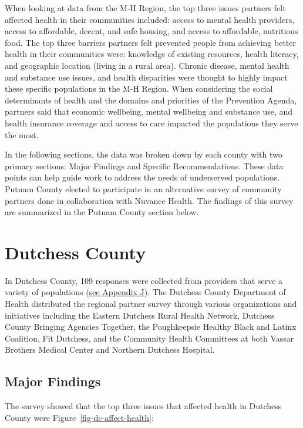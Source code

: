 \documentclass[
  english,
  letterpaper,
]{report}
\begin{document}
When looking at data from the M-H Region, the top three issues partners
felt affected health in their communities included: access to mental
health providers, access to affordable, decent, and safe housing, and
access to affordable, nutritious food. The top three barriers partners
felt prevented people from achieving better health in their communities
were: knowledge of existing resources, health literacy, and geographic
location (living in a rural area). Chronic disease, mental health and
substance use issues, and health disparities were thought to highly
impact these specific populations in the M-H Region. When considering
the social determinants of health and the domains and priorities of the
Prevention Agenda, partners said that economic wellbeing, mental
wellbeing and substance use, and health insurance coverage and access to
care impacted the populations they serve the most.

In the following sections, the data was broken down by each county with
two primary sections: Major Findings and Specific Recommendations. These
data points can help guide work to address the needs of underserved
populations. Putnam County elected to participate in an alternative
survey of community partners done in collaboration with Nuvance Health.
The findings of this survey are summarized in the Putnam County section
below.

\section{Dutchess County}\label{dutchess-county-2}

In Dutchess County, 109 responses were collected from providers that
serve a variety of populations
(\hyperref[sec-appendix-j-community-partner-survey-references]{see
Appendix J}). The Dutchess County Department of Health distributed the
regional partner survey through various organizations and initiatives
including the Eastern Dutchess Rural Health Network, Dutchess County
Bringing Agencies Together, the Poughkeepsie Healthy Black and Latinx
Coalition, Fit Dutchess, and the Community Health Committees at both
Vassar Brothers Medical Center and Northern Dutchess Hospital.

\subsection{Major Findings}\label{major-findings}

The survey showed that the top three issues that affected health in
Dutchess County were Figure~\ref{fig-dc-affect-health}:
\end{document}
